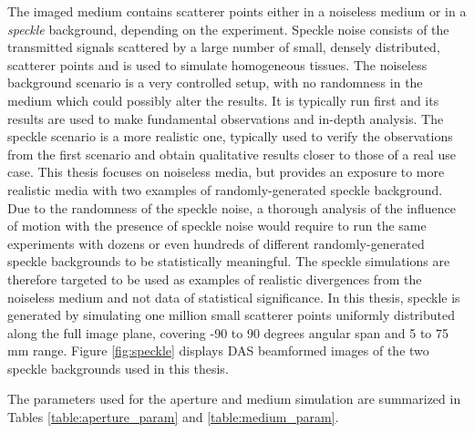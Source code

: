 The imaged medium contains scatterer points either in a noiseless medium or in a \textit{speckle} background, depending on the experiment. Speckle noise consists of the transmitted signals scattered by a large number of small, densely distributed, scatterer points and is used to simulate homogeneous tissues.
The noiseless background scenario is a very controlled setup, with no randomness in the medium which could possibly alter the results. It is typically run first and its results are used to make fundamental observations and in-depth analysis. The speckle scenario is a more realistic one, typically used to verify the observations from the first scenario and obtain qualitative results closer to those of a real use case.
This thesis focuses on noiseless media, but provides an exposure to more realistic media with two examples of randomly-generated speckle background.
Due to the randomness of the speckle noise, a thorough analysis of the influence of motion with the presence of speckle noise would require to run the same experiments with dozens or even hundreds of different randomly-generated speckle backgrounds to be statistically meaningful.
The speckle simulations are therefore targeted to be used as examples of realistic divergences from the noiseless medium and not data of statistical significance.
In this thesis, speckle is generated by simulating one million small scatterer points uniformly distributed along the full image plane, covering -90 to 90 degrees angular span and 5 to 75 mm range.
Figure \ref{fig:speckle} displays DAS beamformed images of the two speckle backgrounds used in this thesis.

The parameters used for the aperture and medium simulation are summarized in Tables \ref{table:aperture_param} and \ref{table:medium_param}.

